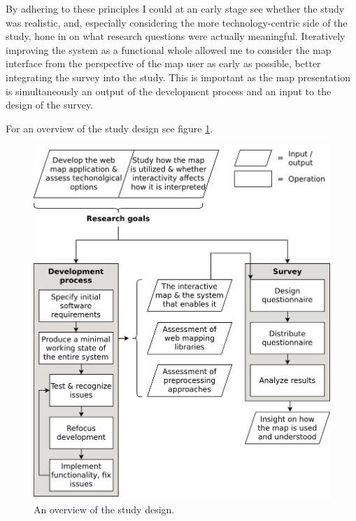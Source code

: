 By adhering to these principles I could at an early stage see
whether the study was realistic, and,
especially considering the more technology-centric side of the study,
hone in on what research questions were actually meaningful.
Iteratively improving the system as a functional whole
allowed me to consider the map interface
from the perspective of the map user as early as possible,
better integrating the survey into the study.
This is important as the map presentation is simultaneously an output of the development process
and an input to the design of the survey.

For an overview of the study design see figure \ref{fig:study design}.


\begin{figure}[H]
	\centering
	\includegraphics[width=\diagramwidth]{visual/figures/diagrams/study_design.png}
	\caption{An overview of the study design.}
	\label{fig:study design}
\end{figure}


